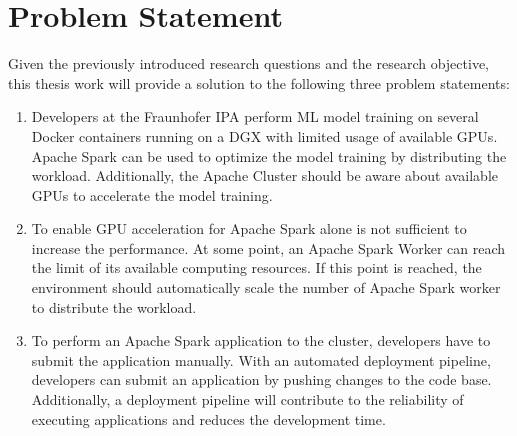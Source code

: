 \section{Problem Statement}
\label{sec:01_introduction_problem}
Given the previously introduced research questions and the research objective, this thesis work will provide a solution to the following three problem statements:

\begin{enumerate}
\item Developers at the Fraunhofer IPA perform ML model training on several Docker containers running on a DGX with limited usage of available GPUs.
Apache Spark can be used to optimize the model training by distributing the workload.
Additionally, the Apache Cluster should be aware about available GPUs to accelerate the model training.

\item To enable GPU acceleration for Apache Spark alone is not sufficient to increase the performance.
At some point, an Apache Spark Worker can reach the limit of its available computing resources.
If this point is reached, the environment should automatically scale the number of Apache Spark worker to distribute the workload.

\item To perform an Apache Spark application to the cluster, developers have to submit the application manually.
With an automated deployment pipeline, developers can submit an application by pushing changes to the code base.
Additionally, a deployment pipeline will contribute to the reliability of executing applications and reduces the development time.
\end{enumerate}


